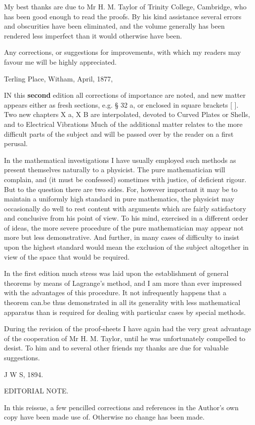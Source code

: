 My best thanks are due to Mr H. M. Taylor of Trinity College, Cambridge,
who has been good enough to read the proofs. By his kind assistance
several errors and obscurities have been eliminated, and the volume
generally has been rendered less imperfect than it would otherwise have
been.

Any corrections, or suggestions for improvements, with which my readers
may favour me will be highly appreciated.

Terling Place, Witham, April, 1877,


IN this \textbf{second} edition all corrections of importance are noted, and new
matter appears either as fresh sections, e.g. § 32 a, or enclosed in
square brackets {[} {]}. Two new chapters X a, X B are interpolated,
devoted to Curved Plates or Shells, and to Electrical Vibrations Much of
the additional matter relates to the more difficult parts of the subject
and will be passed over by the reader on a first perusal.

In the mathematical investigations I have usually employed such methods
as present themselves naturally to a physicist. The pure mathematician
will complain, and (it must be confessed) sometimes with justice, of
deficient rigour. But to the question there are two sides. For, however
important it may be to maintain a uniformly high standard in pure
mathematics, the physicist may occasionally do well to rest content with
arguments which are fairly satisfactory and conclusive from his point
of view. To his mind, exercised in a different order of ideas, the more
severe procedure of the pure mathematician may appear not more but less
demonstrative. And further, in many cases of difficulty to insist
upon the highest standard would mean the exclusion of the subject
altogether in view of the space that would be required.

In the first edition much stress was laid upon the establishment of
general theorems by means of Lagrange's method, and I am more than ever
impressed with the advantages of this procedure. It not infrequently
happens that a theorem can.be thus demonstrated in all its generality
with less mathematical apparatus than is required for dealing with
particular cases by special methods.

During the revision of the proof-sheets I have again had the very great
advantage of the cooperation of Mr H. M. Taylor, until he was
unfortunately compelled to desist. To him and to several other friends
my thanks are due for valuable suggestions.

J W S, 1894.

EDITORIAL NOTE.

In this reissue, a few pencilled corrections and references in the
Author's own copy have been made use of. Otherwise no change has been made.
